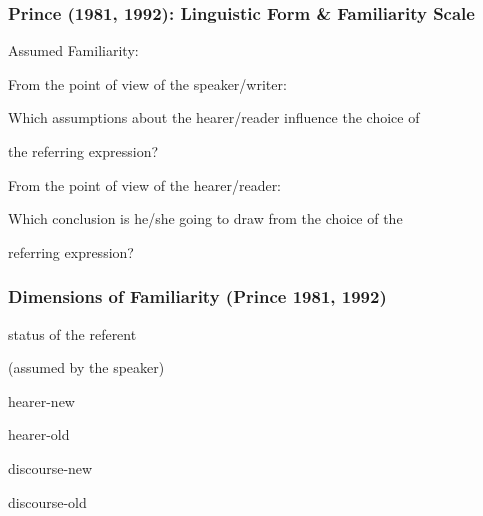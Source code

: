 \documentclass[compress,color=usenames]{beamer}
\begin{document}
\begin{frame}
\frametitle{
Prince (1981, 1992): Linguistic Form \& Familiarity Scale}






Assumed Familiarity:



From the point of view of the speaker/writer:



Which assumptions about the hearer/reader inﬂuence the choice of



the referring expression?



From the point of view of the hearer/reader:



Which conclusion is he/she going to draw from the choice of the



referring expression?










\end{frame}
\begin{frame}
\frametitle{
Dimensions of Familiarity (Prince 1981, 1992)}



status of the referent



(assumed by the speaker)



hearer-new



hearer-old


discourse-new










discourse-old










\end{frame}
\end{document}
